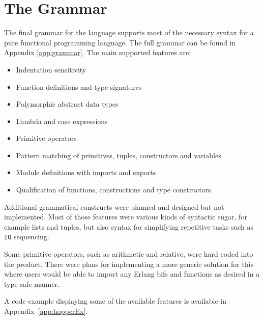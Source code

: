 \section{The Grammar}

The final grammar for the language supports most of the necessary syntax for a pure functional programming language.  The full grammar can be found in Appendix \ref{app:grammar}. The main supported features are:

\begin{itemize}
  \item Indentation sensitivity
  \item Function definitions and type signatures
  \item Polymorphic abstract data types
  \item Lambda and case expressions
  \item Primitive operators
  \item Pattern matching of primitives, tuples, constructors and variables
  \item Module definitions with imports and exports
  \item Qualification of functions, constructions and type constructors
\end{itemize}

Additional grammatical constructs were planned and designed but not implemented. Most of those features were various kinds of syntactic sugar, for example lists and tuples, but also syntax for simplifying repetitive tasks such as \texttt{IO} sequencing.

Some primitive operators, such as arithmetic and relative, were hard coded into the product. There were plans for implementing a more generic solution for this where users would be able to import any Erlang \glspl{bif} and functions as desired in a type safe manner.

A code example displaying some of the available features is available in Appendix~\ref{app:hopperEx}.